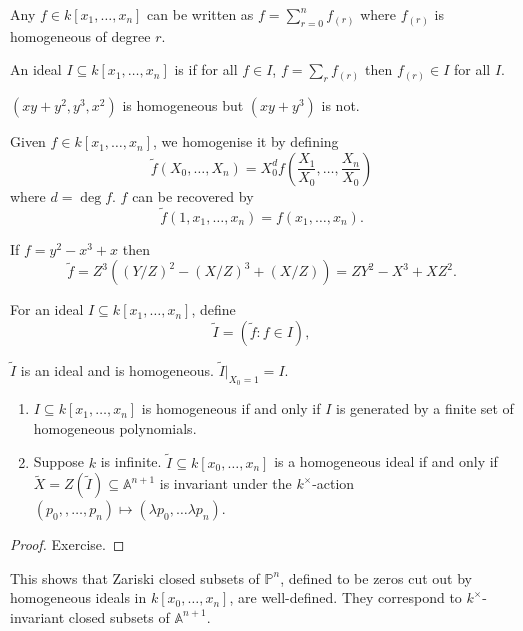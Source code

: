 \documentclass[a4paper]{article}
\renewcommand{\A}{\mathbb{A}}
\renewcommand*{\P}{\mathbb{P}}
\begin{document}
Any \(f \in k[x_1, \dots, x_n]\) can be written as \(f = \sum_{r = 0}^n f_{(r)}\) where \(f_{(r)}\) is homogeneous of degree \(r\).

\begin{definition}
  An ideal \(I \subseteq k[x_1, \dots, x_n]\) is  if for all \(f \in I\), \(f = \sum_r f_{(r)}\) then \(f_{(r)} \in I\) for all \(I\).
\end{definition}

\begin{eg}
  \((xy + y^2, y^3, x^2)\) is homogeneous but \((xy + y^3)\) is not.
\end{eg}

Given \(f \in k[x_1, \dots, x_n]\), we homogenise it by defining
\[
  \tilde f(X_0, \dots, X_n) = X_0^d f(\frac{X_1}{X_0}, \dots, \frac{X_n}{X_0})
\]
where \(d = \deg f\). \(f\) can be recovered by
\[
  \tilde f(1, x_1, \dots, x_n) = f(x_1, \dots, x_n).
\]

\begin{eg}
  If \(f = y^2 - x^3 + x\) then
  \[
    \tilde f = Z^3((Y/Z)^2 - (X/Z)^3 + (X/Z)) = ZY^2 - X^3 + XZ^2.
  \]
\end{eg}

For an ideal \(I \subseteq k[x_1, \dots, x_n]\), define
\[
  \tilde I = (\tilde f: f \in I),
\]

\begin{ex}
  \(\tilde I\) is an ideal and is homogeneous. \(\tilde I|_{X_0 = 1} = I\).
\end{ex}

\begin{lemma}\leavevmode
  \begin{enumerate}
  \item \(I \subseteq k[x_1, \dots, x_n]\) is homogeneous if and only if \(I\) is generated by a finite set of homogeneous polynomials.
  \item Suppose \(k\) is infinite. \(\tilde I \subseteq k[x_0, \dots, x_n]\) is a homogeneous ideal if and only if \(\tilde X = Z(\tilde I) \subseteq \A^{n + 1}\) is invariant under the \(k^\times\)-action \((p_0,, \dots, p_n) \mapsto (\lambda p_0, \dots \lambda p_n)\).
  \end{enumerate}
\end{lemma}

\begin{proof}
  Exercise.
\end{proof}

This shows that Zariski closed subsets of \(\P^n\), defined to be zeros cut out by homogeneous ideals in \(k[x_0, \dots, x_n]\), are well-defined. They correspond to \(k^\times\)-invariant closed subsets of \(\A^{n + 1}\).
\end{document}
